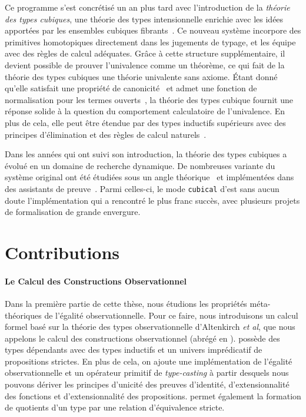 Ce programme s'est concrétisé un an plus tard avec l'introduction de la 
\emph{théorie des types cubiques}, une théorie des types intensionnelle enrichie 
avec les idées apportées par les ensembles cubiques fibrants~.
% 
Ce nouveau système incorpore des primitives homotopiques directement dans les 
jugements de typage, et les équipe avec des règles de calcul adéquates. 
% 
Grâce à cette structure supplémentaire, il devient possible de prouver 
l'univalence comme un théorème, ce qui fait de la théorie des types cubiques une théorie 
univalente sans axiome.
% 
Étant donné qu'elle satisfait une propriété de canonicité~ et admet 
une fonction de normalisation pour les termes ouverts~, 
la théorie des types cubique fournit une réponse solide à la question du comportement 
calculatoire de l'univalence.
% 
En plus de cela, elle peut être étendue par des types inductifs supérieurs avec des 
principes d'élimination et des règles de calcul naturels~.

Dans les années qui ont suivi son introduction, la théorie des types cubiques a 
évolué en un domaine de recherche dynamique. 
% 
De nombreuses variante du système original ont été étudiées sous un angle 
théorique~\cite{AngiuliHouHarper18,ABCFHL} et implémentées dans des assistants de 
preuve~\cite{Cubicaltt, redtt}. 
% 
Parmi celles-ci, le mode \texttt{cubical} d'\Agda est sans aucun doute l'implémentation 
qui a rencontré le plus franc succès, avec plusieurs projets de formalisation de 
grande envergure.

\section{Contributions}

\paragraph{Le Calcul des Constructions Observationnel}
% 
Dans la première partie de cette thèse, nous étudions les propriétés méta-théoriques 
de l'égalité observationnelle. 
% 
Pour ce faire, nous introduisons un calcul formel basé sur la théorie des types 
observationnelle d'Altenkirch \textit{et al}, que nous appelons le calcul 
des constructions observationnel (abrégé en \SetoidCC). 
% 
\SetoidCC possède des types dépendants avec des types inductifs et un univers 
imprédicatif de propositions strictes. 
% 
En plus de cela, on ajoute une implémentation de l'égalité observationnelle 
et un opérateur primitif de \emph{type-casting} à partir desquels nous pouvons 
dériver les principes d'unicité des preuves d'identité, d'extensionnalité des 
fonctions et d'extensionnalité des propositions.
% 
\SetoidCC permet également la formation de quotients d'un type par une relation 
d'équivalence stricte.

